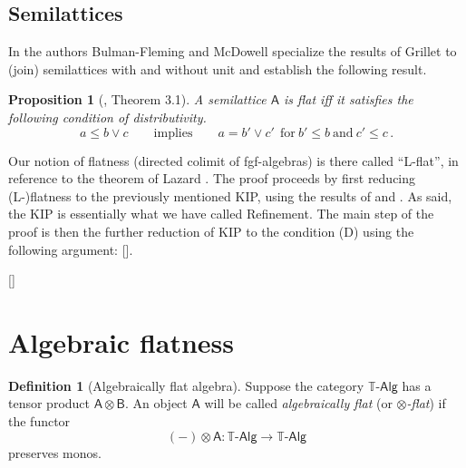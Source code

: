 \documentclass[12pt]{article}
\newcommand{\ednote}[1]{[\textit{\color{red}{#1}}]} %
\newcommand{\C}{\ensuremath{\mathbb{C}}}
\newcommand{\T}{\ensuremath{\mathbb{T}}}
\newcommand{\pshat}[1]{\ensuremath{\widehat{#1}}}
\newcommand{\Set}{\ensuremath{\mathsf{Set}}}
\newcommand{\y}{\ensuremath{\mathsf{y}}} %
\newcommand{\TAlg}{\ensuremath{\T\text{-}\mathsf{Alg}}}
\newcommand{\alg}[1]{\ensuremath{\mathsf{#1}}}
\newcommand{\algA}{\ensuremath{\mathsf{A}}}
\newcommand{\too}{\ensuremath{\longrightarrow}}
\newtheorem{proposition}[theorem]{Proposition}
\theoremstyle{remark}
\theoremstyle{definition}
\newtheorem{definition}[theorem]{Definition}
\begin{document}
{\subsection{Semilattices}

In \cite{BF-MD:78} the authors Bulman-Fleming and McDowell specialize the results of Grillet to (join) semilattices with and without unit and establish the following result.

\begin{proposition}[\cite{BF-MD:78}, Theorem 3.1]
A semilattice $\algA$ is flat iff it satisfies the following condition of \emph{distributivity}.
\begin{equation}\label{prop:flatequalsdist}\tag{D}
a \leq b\vee c\qquad\text{implies}\qquad a = b' \vee c'\ \ \text{for}\  b'\leq b\ \text{and}\ c'\leq c\,.
\end{equation}
\end{proposition} 

Our notion of flatness (directed colimit of fgf-algebras) is there called ``L-flat'', in reference to the theorem of Lazard \cite{L:1969}.  The proof proceeds by first reducing (L-)flatness to the previously mentioned  KIP, using the results of \cite{Grillet} and \cite{Shannon}.  As said, the KIP is essentially what we have called Refinement.  The main step of the proof is then the further reduction of KIP to the condition (D) using the following argument:
\ednote{summarize the proof of 2.7}. 

\bigskip

\ednote{Other theories to consider: (not nec.\ commutative) monoids, distributive lattices with and w/o $0,1$, abelian groups, commutative rings, frames, boolean algebras.}

\section{Algebraic flatness}\label{section:algebraic_flat}

\begin{definition}[Algebraically flat algebra]  Suppose the category $\TAlg$ has a tensor product $\alg{A} \otimes \alg{B}$. An object $\alg{A}$ will be called \emph{algebraically flat} (or \emph{$\otimes$-flat}) if the functor $$(-)\otimes \alg{A} : \TAlg \too \TAlg$$ preserves monos. 
\end{definition}

}
\end{document}

